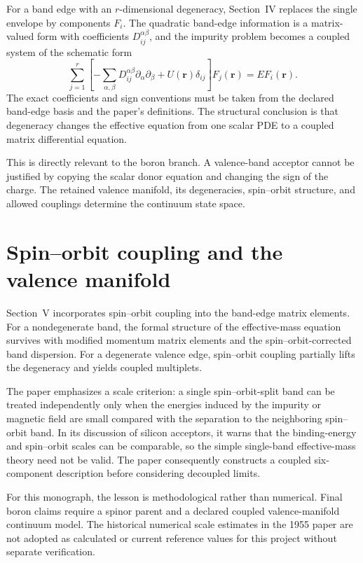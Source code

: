 For a band edge with an $r$-dimensional degeneracy, Section~IV replaces the
single envelope by components $F_i$. The quadratic band-edge information is a
matrix-valued form with coefficients $D_{ij}^{\alpha\beta}$, and the impurity
problem becomes a coupled system of the schematic form
\begin{equation}
  \sum_{j=1}^{r}
  \left[
    -\sum_{\alpha,\beta}
    D_{ij}^{\alpha\beta}
    \partial_\alpha\partial_\beta
    +U(\mathbf r)\delta_{ij}
  \right]F_j(\mathbf r)
  =
  E F_i(\mathbf r).
  \label{eq:lk-degenerate-envelope}
\end{equation}
The exact coefficients and sign conventions must be taken from the declared
band-edge basis and the paper's definitions. The structural conclusion is that
degeneracy changes the effective equation from one scalar PDE to a coupled
matrix differential equation.

This is directly relevant to the boron branch. A valence-band acceptor cannot
be justified by copying the scalar donor equation and changing the sign of the
charge. The retained valence manifold, its degeneracies, spin--orbit structure,
and allowed couplings determine the continuum state space.

\section{Spin--orbit coupling and the valence manifold}

Section~V incorporates spin--orbit coupling into the band-edge matrix elements.
For a nondegenerate band, the formal structure of the effective-mass equation
survives with modified momentum matrix elements and the spin--orbit-corrected
band dispersion. For a degenerate valence edge, spin--orbit coupling partially
lifts the degeneracy and yields coupled multiplets.

The paper emphasizes a scale criterion: a single spin--orbit-split band can be
treated independently only when the energies induced by the impurity or
magnetic field are small compared with the separation to the neighboring
spin--orbit band. In its discussion of silicon acceptors, it warns that the
binding-energy and spin--orbit scales can be comparable, so the simple
single-band effective-mass theory need not be valid. The paper consequently
constructs a coupled six-component description before considering decoupled
limits.

For this monograph, the lesson is methodological rather than numerical. Final
boron claims require a spinor parent and a declared coupled valence-manifold
continuum model. The historical numerical scale estimates in the 1955 paper are
not adopted as calculated or current reference values for this project without
separate verification.

